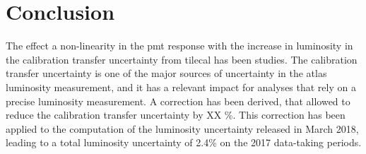 \section{Conclusion}

The effect a non-linearity in the \gls{pmt} response with the increase in luminosity in the calibration transfer uncertainty from 
\gls{tilecal} has been studies. 
The calibration transfer uncertainty is one of the major sources of uncertainty in the \gls{atlas} luminosity 
measurement, and it has a relevant impact for analyses that rely on a precise luminosity measurement. 
A correction has been derived, that allowed to reduce the calibration transfer uncertainty by XX \%.
This correction has been applied to the computation of the luminosity uncertainty released in March 2018, 
leading to a total luminosity uncertainty of 2.4\% on the 2017 data-taking periods. 


